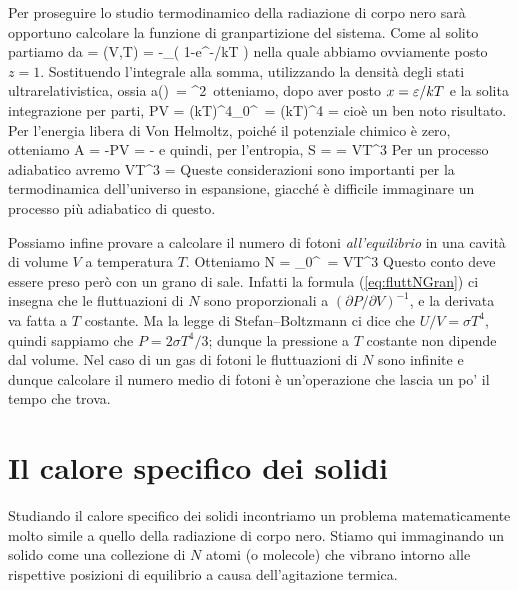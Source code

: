 Per proseguire lo studio termodinamico della radiazione di corpo nero sarà opportuno calcolare la funzione di granpartizione del sistema. Come al solito partiamo da
\be
{} = \ln \calQ(V,T) = -\sum_\eps\ln\left(
1-e^{-\eps/kT}
\right)
\ee
nella quale abbiamo ovviamente posto $z=1$. Sostituendo l'integrale alla somma, utilizzando la densità degli stati ultrarelativistica, ossia
\be
a(\eps)\,\de{\eps} = \eps^2\,\de{\eps}
\ee
otteniamo, dopo aver posto $x = \varepsilon/kT$ e la solita integrazione per parti,
\be
PV = (kT)^4\int_0^\infty {}\,
= (kT)^4 = 
\ee
cioè un ben noto risultato. Per l'energia libera di Von Helmoltz, poiché il potenziale chimico è zero, otteniamo
\be
A = -PV = -
\ee
e quindi, per l'entropia,
\be
S =  = \propto VT^3
\ee
Per un processo adiabatico avremo
\be
VT^3 = 
\ee
Queste considerazioni sono importanti per la termodinamica dell'universo in espansione, giacché è difficile immaginare un processo più adiabatico di questo.

Possiamo infine provare a calcolare il numero di fotoni {\em all'equilibrio} in una cavità di volume $V$ a temperatura $T$. Otteniamo
\be
N =  \int_0^\infty \de{\omega}\, 
 =  \propto VT^3
\ee
Questo conto deve essere preso però con un grano di sale. Infatti la formula (\ref{eq:fluttNGran}) ci insegna che le fluttuazioni di $N$ sono proporzionali a
$(\partial P / \partial V)^{-1}$, e la derivata va fatta a $T$ costante. Ma la legge di Stefan--Boltzmann ci dice che $U/V = \sigma T^4$, quindi sappiamo che $P = 2\sigma T^4/3$;  dunque la pressione a $T$ costante non dipende dal volume. Nel caso di un gas di fotoni le fluttuazioni di $N$ sono infinite e dunque calcolare il numero medio di fotoni è un'operazione che lascia un po' il tempo che trova.

\section{Il calore specifico dei solidi}

Studiando il calore specifico dei solidi incontriamo un problema matematicamente molto simile a quello della radiazione di corpo nero. Stiamo qui immaginando un solido come una collezione di $N$ atomi (o molecole) che vibrano intorno alle rispettive posizioni di equilibrio a causa dell'agitazione termica.

